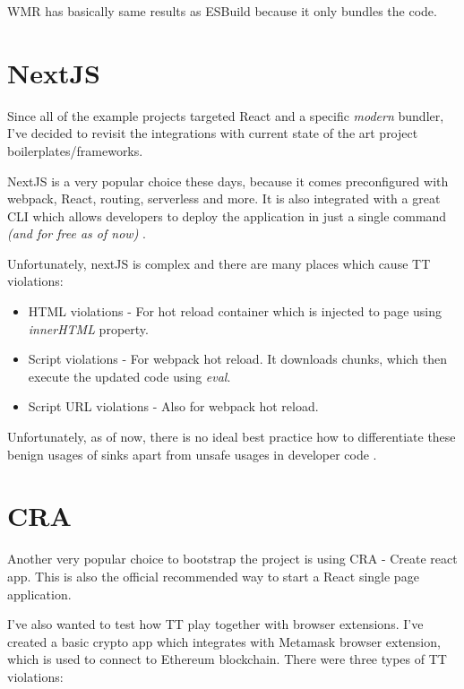 WMR has basically same results as ESBuild because it only bundles the code.

\section{NextJS}

Since all of the example projects targeted React and a specific \emph{modern} bundler, I've decided
to revisit the integrations with current state of the art project boilerplates/frameworks.

NextJS is a very popular choice these days, because it comes preconfigured with webpack, React,
routing, serverless and more. It is also integrated with a great CLI which allows developers to
deploy the application in just a single command \emph{(and for free as of now)} \cite{nextjs_web}.

Unfortunately, nextJS is complex and there are many places which cause TT violations:

\begin{itemize}
  \item  HTML violations - For hot reload container which is injected to page using \emph{innerHTML}
        property.
  \item  Script violations - For webpack hot reload. It downloads chunks, which then execute the
        updated code using \emph{eval}.
  \item  Script URL violations - Also for webpack hot reload.
\end{itemize}

Unfortunately, as of now, there is no ideal best practice how to differentiate these benign usages
of sinks apart from unsafe usages in developer code \cite{tt_source_file_violation_issue}.

\section{CRA}

Another very popular choice to bootstrap the project is using CRA - Create react app. This is also
the official recommended way to start a React single page application.

I've also wanted to test how TT play together with browser extensions. I've created a basic crypto
app which integrates with Metamask browser extension, which is used to connect to Ethereum
blockchain. There were three types of TT violations:

